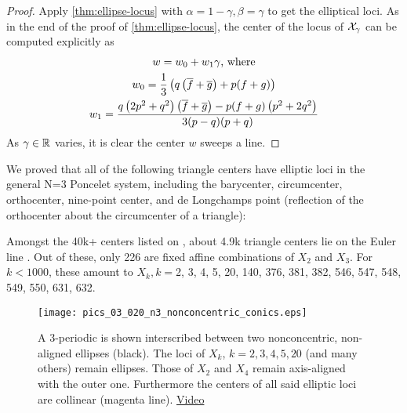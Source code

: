 \begin{proof}
Apply   \cref{thm:ellipse-locus} with $\alpha=1-\gamma, \beta=\gamma$ to get the elliptical loci. As in the end of the proof of  \cref{thm:ellipse-locus}, the center of the locus of $\mathcal{X}_\gamma$ can be computed explicitly as 
\begin{gather*}
    w=w_0+w_1 \gamma \text{, where}\\
    w_0=\frac{1}{3} \left(q \left(\overline{f}+\overline{g}\right)+p (f+g)\right)\\
    w_1=\frac{q \left(2 p^2+q^2\right) \left(\overline{f}+\overline{g}\right)-p (f+g) \left(p^2+2 q^2\right)}{3 (p-q) (p+q)}
\end{gather*}
As $\gamma\in\mathbb{R}$ varies, it is clear the center $w$ sweeps a line.
\end{proof}

We proved that all of the following triangle centers have elliptic loci in the general N=3 Poncelet system, including the barycenter, circumcenter, orthocenter, nine-point center, and de Longchamps point (reflection of the orthocenter  about the circumcenter of a triangle):

\begin{observation}
Amongst the 40k+ centers listed on \cite{etc}, about 4.9k triangle centers lie on the Euler line \cite{etc-central-lines}. Out of these, only 226 are fixed affine combinations of $X_2$ and $X_3$. For $k<1000$, these amount to $X_k,k=${\small 2, 3, 4, 5, 20, 140, 376, 381, 382, 546, 547, 548, 549, 550, 631, 
632}.
\label{obs:affine-euler-line}
\end{observation}

\begin{figure}
     \centering
     \texttt{[image: pics\_03\_020\_n3\_nonconcentric\_conics.eps]}
     \caption{A 3-periodic is shown interscribed between two nonconcentric, non-aligned ellipses (black). The loci of $X_k$, $k=2,3,4,5,20$ (and many others) remain ellipses. Those of $X_2$ and $X_4$ remain axis-aligned with the outer one. Furthermore the centers of all said elliptic loci are collinear (magenta line). \href{https://youtu.be/p1medAei_As}{Video}}
     \label{fig:nonconcentric-xns}
 \end{figure}
 
 
